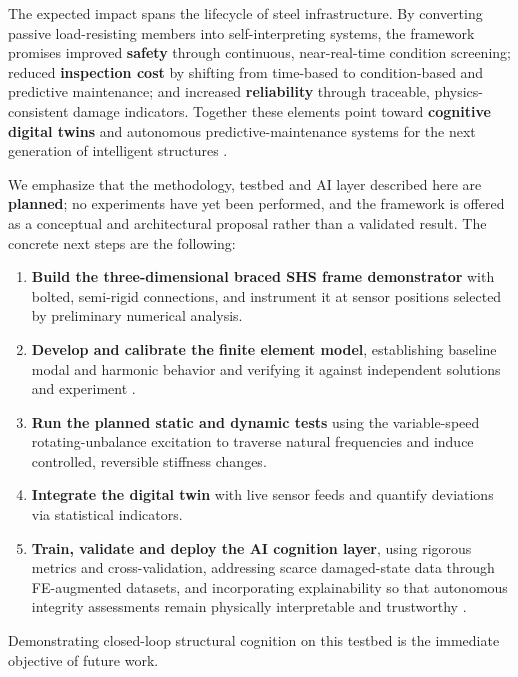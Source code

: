 The expected impact spans the lifecycle of steel infrastructure. By converting passive load-resisting members into self-interpreting systems, the framework promises improved \textbf{safety} through continuous, near-real-time condition screening; reduced \textbf{inspection cost} by shifting from time-based to condition-based and predictive maintenance; and increased \textbf{reliability} through traceable, physics-consistent damage indicators. Together these elements point toward \textbf{cognitive digital twins} and autonomous predictive-maintenance systems for the next generation of intelligent structures \citep{chiachio2022structural,zou2026deep}.

We emphasize that the methodology, testbed and AI layer described here are \textbf{planned}; no experiments have yet been performed, and the framework is offered as a conceptual and architectural proposal rather than a validated result. The concrete next steps are the following:

\begin{enumerate}
    \item \textbf{Build the three-dimensional braced SHS frame demonstrator} with bolted, semi-rigid connections, and instrument it at sensor positions selected by preliminary numerical analysis.
    \item \textbf{Develop and calibrate the finite element model}, establishing baseline modal and harmonic behavior and verifying it against independent solutions and experiment \citep{cook2002fea}.
    \item \textbf{Run the planned static and dynamic tests} using the variable-speed rotating-unbalance excitation to traverse natural frequencies and induce controlled, reversible stiffness changes.
    \item \textbf{Integrate the digital twin} with live sensor feeds and quantify deviations via statistical indicators.
    \item \textbf{Train, validate and deploy the AI cognition layer}, using rigorous metrics and cross-validation, addressing scarce damaged-state data through FE-augmented datasets, and incorporating explainability so that autonomous integrity assessments remain physically interpretable and trustworthy \citep{naser2023ml}.
\end{enumerate}

Demonstrating closed-loop structural cognition on this testbed is the immediate objective of future work.
